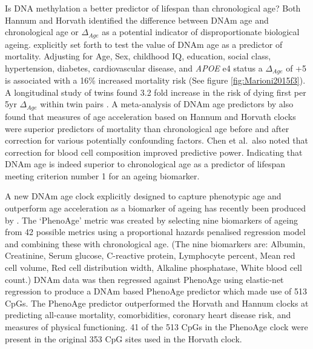 \documentclass[]{book}
\begin{document}
Is DNA methylation a better predictor of lifespan than chronological age? Both Hannum and Horvath identified the difference between DNAm age and chronological age or \(\Delta_{Age}\) as a potential indicator of disproportionate biological ageing. \citet{Marioni2015} explicitly set forth to test the value of DNAm age as a predictor of mortality. Adjusting for Age, Sex, childhood IQ, education, social class, hypertension, diabetes, cardiovascular disease, and \emph{APOE} e4 status a \(\Delta_{Age}\) of +5 is associated with a 16\% increased mortality risk (See figure \ref{fig:Marioni2015f3}). A longitudinal study of twins found 3.2 fold increase in the risk of dying first per 5yr \(\Delta_{Age}\) within twin pairs \citep{Christiansen2016}. A meta-analysis of DNAm age predictors by \citet{Chen2016a} also found that measures of age acceleration based on Hannum and Horvath clocks were superior predictors of mortality than chronological age before and after correction for various potentially confounding factors. Chen et al.~also noted that correction for blood cell composition improved predictive power. Indicating that DNAm age is indeed superior to chronological age as a predictor of lifespan meeting criterion number 1 for an ageing biomarker.

A new DNAm age clock explicitly designed to capture phenotypic age and outperform age acceleration as a biomarker of ageing has recently been produced by \citet{Levine2018}. The `PhenoAge' metric was created by selecting nine biomarkers of ageing from 42 possible metrics using a proportional hazards penalised regression model and combining these with chronological age. (The nine biomarkers are: Albumin, Creatinine, Serum glucose, C-reactive protein, Lymphocyte percent, Mean red cell volume, Red cell distribution width, Alkaline phosphatase, White blood cell count.) DNAm data was then regressed against PhenoAge using elastic-net regression to produce a DNAm based PhenoAge predictor which made use of 513 CpGs. The PhenoAge predictor outperformed the Horvath and Hannum clocks at predicting all-cause mortality, comorbidities, coronary heart disease risk, and measures of physical functioning. 41 of the 513 CpGs in the PhenoAge clock were present in the original 353 CpG sites used in the Horvath clock.
\end{document}
